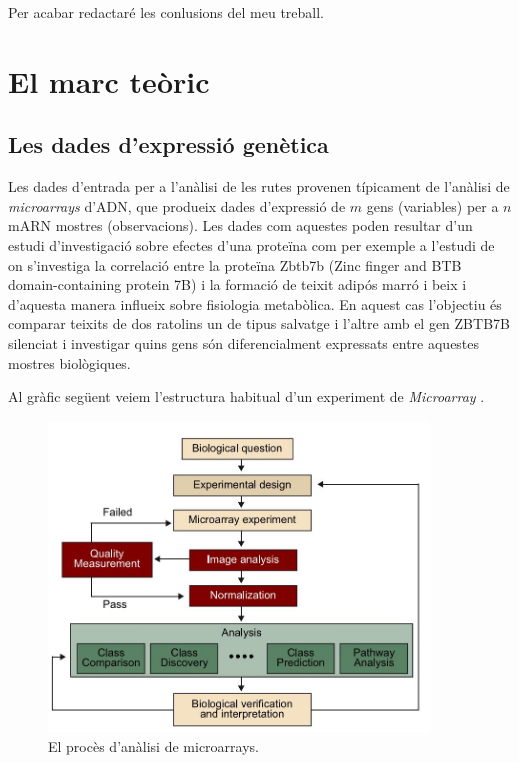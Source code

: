 Per acabar redactaré les conlusions del meu treball.
\chapter{El marc teòric}

\section{Les dades d'expressió genètica}
Les dades d'entrada per a l'anàlisi de les rutes provenen típicament de l'anàlisi de \textit{microarrays} d'ADN, que produeix dades d'expressió de $m$ gens (variables) per a $n$ mARN mostres (observacions). Les dades com aquestes poden resultar d'un estudi d'investigació sobre efectes d'una proteïna com per exemple a l'estudi de \cite{li2017zbtb7b} on s'investiga la correlació entre la proteïna Zbtb7b (Zinc finger and BTB domain-containing protein 7B) i la formació de teixit adipós marró i beix i d'aquesta manera influeix sobre fisiologia metabòlica. En aquest cas l'objectiu és comparar teixits de dos ratolins un de tipus salvatge i l'altre amb el gen ZBTB7B silenciat i investigar quins gens són diferencialment expressats entre aquestes mostres biològiques. 

Al gràfic següent veiem l'estructura habitual d'un experiment de \textit{Microarray}  \cite{plaPID00192743}.

\begin{figure}[H]
\centering
\includegraphics[width=0.9\textwidth]{figures/Pipeline_Microarray.jpg} 
\caption{El procès d'anàlisi de microarrays.}
\end{figure}

